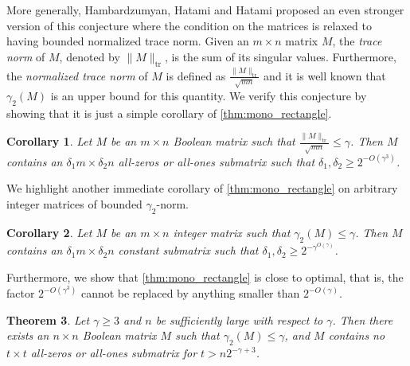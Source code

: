 \documentclass[11pt]{amsart}
\theoremstyle{plain}
\newtheorem{theorem}{Theorem}[section]
\newtheorem{corollary}[theorem]{Corollary}
\theoremstyle{definition}
\DeclareMathOperator{\tr}{tr}
\newcommand{\istvan}[1]{\textcolor{red}{it: #1}}
\newcommand{\lianna}[1]{\textcolor{blue}{lh: #1}}
\begin{document}
More generally, Hambardzumyan, Hatami and Hatami \cite{HHH} proposed an even stronger version of this conjecture where the condition on the matrices is relaxed to having bounded normalized trace norm. Given an $m\times n$ matrix $M$, the \emph{trace norm} of $M$, denoted by $\|M\|_{\tr}$, is the sum of its singular values. Furthermore, the \emph{normalized trace norm} of $M$ is defined as $\frac{\|M\|_{\tr}}{\sqrt{mn}}$ and it is well known that $\gamma_2(M)$ is an upper bound for this quantity. We verify this conjecture by showing that it is just a simple corollary of \cref{thm:mono_rectangle}. 

\begin{corollary}\label{cor:trace}
Let $M$ be an $m\times n$ Boolean matrix such that $\frac{\|M\|_{\tr}}{\sqrt{mn}}\leq \gamma$. Then $M$ contains an $\delta_1 m\times \delta_2 n$ all-zeros or all-ones submatrix such that $\delta_1,\delta_2\geq 2^{-O(\gamma^3)}$.
\end{corollary}

We highlight another immediate corollary of \cref{thm:mono_rectangle} on arbitrary integer matrices of bounded $\gamma_2$-norm.

\begin{corollary}\label{cor:integer}
    Let $M$ be an $m\times n$ integer matrix such that $\gamma_2(M)\leq \gamma$. Then $M$ contains an $\delta_1 m\times \delta_2 n$ constant submatrix such that $\delta_1,\delta_2\geq 2^{-\gamma^{O(\gamma)}}$.
\end{corollary}

Furthermore, we show that \cref{thm:mono_rectangle}  is close to optimal, that is, the factor $2^{-O(\gamma^3)}$ cannot be replaced by anything smaller than $2^{-O(\gamma)}$.


\begin{theorem}\label{prop:construction}
Let $\gamma\geq 3$ and $n$ be sufficiently large with respect to $\gamma$. Then there exists an $n\times n$ Boolean matrix $M$ such that $\gamma_2(M)\leq \gamma$, and $M$ contains no $t\times t$ all-zeros or all-ones submatrix for $t>n2^{-\gamma+3}$.
\end{theorem}
\end{document}
